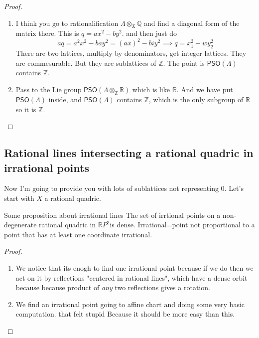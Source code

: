 \begin{proof}\leavevmode
	\begin{enumerate}[label=\textbf{Step \arabic*}]
		\item I think you go to rationalification $\Lambda\otimes_\mathfrak{X} \mathbb{Q}$ and find a diagonal form of the matrix there. This is $q=ax^2-by^2$. and then just do
			\[aq=a^2x^2-bay^2=(ax)^2-biy^2\implies q=x_1^2-wy_2^2\]
There are two lattices, multiply by denominators, get integer lattices. They are commesurable. But they are sublattices of $\mathbb{Z}$. The point is $\mathsf{PSO}(\Lambda)$ contains $ \mathbb{Z}$.
\item Pass to the Lie group $\mathsf{PSO}(\Lambda\otimes_\mathbb{Z}\mathbb{R})$ which is like $\mathbb{R}$. And we have put $\mathsf{PSO}(\Lambda)$ inside, and $\mathsf{PSO}(\Lambda)$ contains $\mathbb{Z}$, which is the only subgroup of  $\mathbb{R}$ so it is $\mathbb{Z}$.
	\end{enumerate}
\end{proof}

\subsection{Rational lines intersecting a rational quadric in irrational points}

Now I'm going to provide you with lots of sublattices not representing 0. Let's start with $X$ a rational quadric.

\begin{idea4}{Some proposition about irrational lines}\leavevmode
	The set of irrtional points on a non-degenerate rational quadric in $\mathbb{R}P^{2}$is dense. Irrational=point not proportional to a point that has at least one coordinate irrational.
\end{idea4}

\begin{proof}\leavevmode
	\begin{enumerate}[label=\textbf{Step \arabic*}]
		\item We notice that its enogh to find one irrational point because if we do then we act on it by reflections "centered in rational lines", which have a dense orbit because because product of \textit{any } two reflections gives a rotation.

		\item We find an irrational point going to affine chart and doing some very basic computation. that felt stupid Because it should be more easy than this.
	\end{enumerate}
\end{proof}

